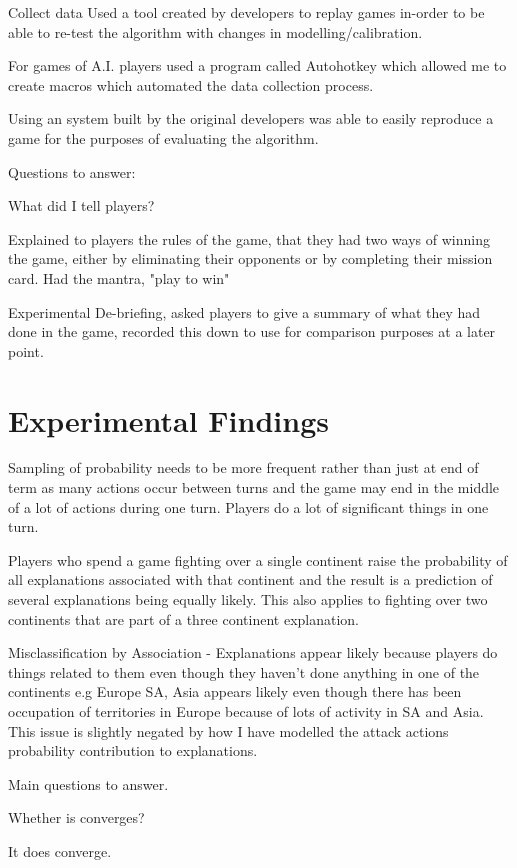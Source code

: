 \documentclass[parskip]{cs4rep}
\begin{document}
Collect data
Used a tool created by developers to replay games in-order to be able to re-test the algorithm with changes in modelling/calibration.

For games of A.I. players used a program called Autohotkey which allowed me to create macros which automated the data collection process.

Using an system built by the original developers was able to easily reproduce a game for the purposes of evaluating the algorithm.

Questions to answer:

What did I tell players?

Explained to players the rules of the game, that they had two ways of winning the game, either by eliminating their opponents or by completing their mission card. Had the mantra, "play to win"

Experimental De-briefing, asked players to give a summary of what they had done in the game, recorded this down to use for comparison purposes at a later point.

\section{Experimental Findings}

Sampling of probability needs to be more frequent rather than just at end of term as many actions occur between turns and the game may end in the middle of a lot of actions during one turn. Players do a lot of significant things in one turn.

Players who spend a game fighting over a single continent raise the probability of all explanations associated with that continent and the result is a prediction of several explanations being equally likely. This also applies to fighting over two continents that are part of a three continent explanation.

Misclassification by Association - Explanations appear likely because players do things related to them even though they haven't done anything in one of the continents e.g Europe SA, Asia appears likely even though there has been occupation of territories in Europe because of lots of activity in SA and Asia. This issue is slightly negated by how I have modelled the attack actions probability contribution to explanations.

Main questions to answer.

Whether is converges?

It does converge.
\end{document}
